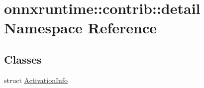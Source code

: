 \hypertarget{namespaceonnxruntime_1_1contrib_1_1detail}{}\section{onnxruntime\+:\+:contrib\+:\+:detail Namespace Reference}
\label{namespaceonnxruntime_1_1contrib_1_1detail}
\subsection*{Classes}
\begin{DoxyCompactItemize}
\item 
struct \mbox{\hyperlink{structonnxruntime_1_1contrib_1_1detail_1_1ActivationInfo}{Activation\+Info}}
\end{DoxyCompactItemize}
